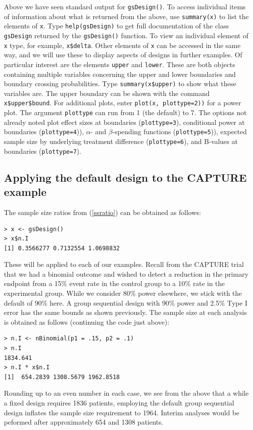 \bigskip

Above we have seen standard output for \texttt{gsDesign()}. 
To access individual items of information about what is returned from the above, use \texttt{summary(x)} to list the elements of \texttt{x}.
Type \texttt{help(gsDesign)} to get full documentation of the class \texttt{gsDesign} returned by the \texttt{gsDesign()} function. 
To view an individual element of \texttt{x} type, for example, \texttt{x\$delta}. 
Other elements of \texttt{x} can be accessed in the same way, and we will use these to display aspects of designs in further examples. 
Of particular interest are the elements \texttt{upper} and \texttt{lower}. 
These are both objects containing multiple variables concerning the upper and lower boundaries and boundary crossing probabilities.
Type \texttt{summary(x\$upper)} to show what these variables are. 
The upper boundary can be shown with the command \texttt{x\$upper\$bound}.
For additional plots, enter \texttt{plot(x, plottype=2))} for a power plot.
The argument \texttt{plottype} can run from 1 (the default) to 7.
The options not already noted plot effect sizes at boundaries (\texttt{plottype=3}), conditional power at boundaries (\texttt{plottype=4})), 
$\alpha$- and $\beta$-spending functions (\texttt{plottype=5})), expected sample size by underlying treatment difference (\texttt{plottype=6}), and B-values at boundaries (\texttt{plottype=7}).

\subsection{Applying the default design to the CAPTURE example}
The sample size ratios from (\ref{ssratio}) can be obtained as follows:
\begin{verbatim}
> x <- gsDesign()
> x$n.I
[1] 0.3566277 0.7132554 1.0698832
\end{verbatim}
These will be applied to each of our examples.
Recall from the CAPTURE trial that we had a binomial outcome and wished to detect a reduction in the primary endpoint from a 15\% event rate in the control group to a 10\% rate in the experimental group.
While we consider 80\% power elsewhere, we stick with the default of 90\% here.
A group sequential design with 90\% power and 2.5\% Type I error has the same bounds as shown previously. The sample size at each analysis is obtained as follows (continuing the code just above):
\begin{verbatim}
> n.I <- nBinomial(p1 = .15, p2 = .1)
> n.I
1834.641
> n.I * x$n.I
[1]  654.2839 1308.5679 1962.8518
\end{verbatim}
Rounding up to an even number in each case, we see from the above that a while a fixed design requires 1836 patients, employing the default group sequential design inflates the sample size requirement to 1964. 
Interim analyses would be peformed after approximately 654 and 1308 patients.

